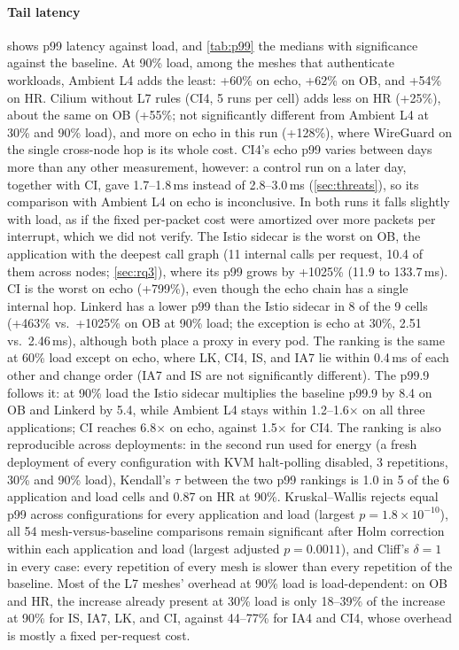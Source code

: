 \paragraph{Tail latency}
 shows p99 latency against load, and \cref{tab:p99} the
medians with significance against the baseline. At 90\% load, among the
meshes that authenticate workloads, Ambient L4 adds the least: +60\% on echo,
+62\% on OB, and +54\% on HR. Cilium without L7 rules (CI4, 5 runs per cell)
adds less on HR (+25\%), about the same on OB (+55\%; not significantly
different from Ambient L4 at 30\% and 90\% load), and more on echo in this
run (+128\%), where WireGuard on the single cross-node hop is its whole cost.
CI4's echo p99 varies between days more than any other measurement, however:
a control run on a later day, together with CI, gave 1.7--1.8\,ms instead of
2.8--3.0\,ms
(\cref{sec:threats}), so its comparison with Ambient L4 on echo is
inconclusive. In both runs it falls slightly with load, as if the fixed
per-packet cost were amortized over more packets per interrupt, which we did
not verify. The Istio sidecar is
the worst on OB, the application with the deepest call graph (11 internal calls
per request, 10.4 of them across nodes; \cref{sec:rq3}), where its p99 grows by
+1025\% (11.9 to 133.7\,ms). CI is the worst on echo (+799\%), even though
the echo chain has a single internal hop. Linkerd has a lower p99 than the
Istio sidecar in 8 of the 9 cells (+463\% vs.\ +1025\% on OB at 90\% load;
the exception is echo at 30\%, 2.51 vs.\ 2.46\,ms), although both place a
proxy in every pod. The ranking is the same at 60\% load except on echo, where
LK, CI4, IS, and IA7 lie within 0.4\,ms of each other and change order (IA7
and IS are not significantly different). The p99.9 follows it: at 90\% load the
Istio sidecar multiplies the baseline p99.9 by 8.4 on OB and Linkerd by 5.4,
while Ambient L4 stays within 1.2--1.6$\times$ on all three applications;
CI reaches 6.8$\times$ on echo, against 1.5$\times$ for CI4.
The ranking is also reproducible across deployments: in the second run used
for energy (a fresh deployment of every configuration with KVM halt-polling
disabled, 3 repetitions, 30\% and 90\% load), Kendall's $\tau$ between the two p99 rankings is 1.0 in 5 of the
6 application and load cells and 0.87 on HR at 90\%.
Kruskal--Wallis rejects equal p99 across configurations for every application
and load (largest $p = 1.8\times10^{-10}$), all 54 mesh-versus-baseline
comparisons remain significant after Holm correction within each application
and load (largest adjusted $p = 0.0011$), and Cliff's
$\delta = 1$ in every case: every repetition of every mesh is slower than every
repetition of the baseline. Most of the L7 meshes' overhead at 90\% load is load-dependent: on
OB and HR, the increase already present at 30\% load is only 18--39\% of the
increase at 90\% for IS, IA7, LK, and CI, against 44--77\% for IA4 and CI4,
whose overhead is mostly a fixed per-request cost.

